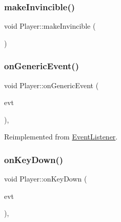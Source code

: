 \hypertarget{class_player_ae94b4c382ac84356018e9f11b13340af}{}\label{class_player_ae94b4c382ac84356018e9f11b13340af} 
\subsubsection{\texorpdfstring{make\+Invincible()}{makeInvincible()}}
{\footnotesize\ttfamily void Player\+::make\+Invincible (\begin{DoxyParamCaption}{ }\end{DoxyParamCaption})}

\hypertarget{class_player_a450eb63d50f2127f4417f50fa926ca30}{}\label{class_player_a450eb63d50f2127f4417f50fa926ca30} 
\subsubsection{\texorpdfstring{on\+Generic\+Event()}{onGenericEvent()}}
{\footnotesize\ttfamily void Player\+::on\+Generic\+Event (\begin{DoxyParamCaption}\item[{\hyperlink{class_event_listener_a23add62d02511a54eba0bae8208f9f48}{Generic\+Event}}]{evt }\end{DoxyParamCaption})\hspace{0.3cm}{\ttfamily [override]}, {\ttfamily [virtual]}}



Reimplemented from \hyperlink{class_event_listener}{Event\+Listener}.

\hypertarget{class_player_a49ffb438bc970b3d72be35752eac1ce5}{}\label{class_player_a49ffb438bc970b3d72be35752eac1ce5} 
\subsubsection{\texorpdfstring{on\+Key\+Down()}{onKeyDown()}}
{\footnotesize\ttfamily void Player\+::on\+Key\+Down (\begin{DoxyParamCaption}\item[{\hyperlink{class_event_listener_ae72c5cb67f8dc880170bf2137837f6ce}{Key\+Down\+Event}}]{evt }\end{DoxyParamCaption})\hspace{0.3cm}{\ttfamily [override]}, {\ttfamily [virtual]}}



